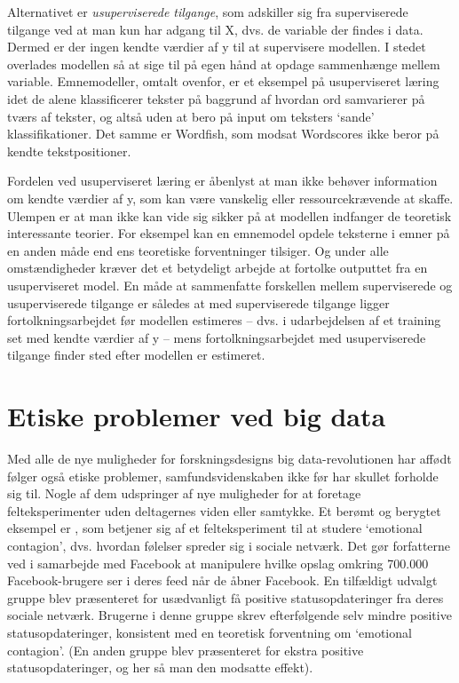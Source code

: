 \documentclass[12pt,]{article}
\begin{document}
Alternativet er \emph{usuperviserede tilgange}, som adskiller sig fra
superviserede tilgange ved at man kun har adgang til X, dvs. de variable
der findes i data. Dermed er der ingen kendte værdier af y til at
supervisere modellen. I stedet overlades modellen så at sige til på egen
hånd at opdage sammenhænge mellem variable. Emnemodeller, omtalt
ovenfor, er et eksempel på usuperviseret læring idet de alene
klassificerer tekster på baggrund af hvordan ord samvarierer på tværs af
tekster, og altså uden at bero på input om teksters `sande'
klassifikationer. Det samme er Wordfish, som modsat Wordscores ikke
beror på kendte tekstpositioner.

Fordelen ved usuperviseret læring er åbenlyst at man ikke behøver
information om kendte værdier af y, som kan være vanskelig eller
ressourcekrævende at skaffe. Ulempen er at man ikke kan vide sig sikker
på at modellen indfanger de teoretisk interessante teorier. For eksempel
kan en emnemodel opdele teksterne i emner på en anden måde end ens
teoretiske forventninger tilsiger. Og under alle omstændigheder kræver
det et betydeligt arbejde at fortolke outputtet fra en usuperviseret
model. En måde at sammenfatte forskellen mellem superviserede og
usuperviserede tilgange er således at med superviserede tilgange ligger
fortolkningsarbejdet før modellen estimeres -- dvs. i udarbejdelsen af
et training set med kendte værdier af y -- mens fortolkningsarbejdet med
usuperviserede tilgange finder sted efter modellen er estimeret.

\hypertarget{etiske-problemer-ved-big-data}{%
\section{Etiske problemer ved big
data}\label{etiske-problemer-ved-big-data}}

Med alle de nye muligheder for forskningsdesigns big data-revolutionen
har affødt følger også etiske problemer, samfundsvidenskaben ikke før
har skullet forholde sig til. Nogle af dem udspringer af nye muligheder
for at foretage felteksperimenter uden deltagernes viden eller samtykke.
Et berømt og berygtet eksempel er \citet{kramer2014experimental}, som
betjener sig af et felteksperiment til at studere `emotional contagion',
dvs. hvordan følelser spreder sig i sociale netværk. Det gør forfatterne
ved i samarbejde med Facebook at manipulere hvilke opslag omkring
700.000 Facebook-brugere ser i deres feed når de åbner Facebook. En
tilfældigt udvalgt gruppe blev præsenteret for usædvanligt få positive
statusopdateringer fra deres sociale netværk. Brugerne i denne gruppe
skrev efterfølgende selv mindre positive statusopdateringer, konsistent
med en teoretisk forventning om `emotional contagion'. (En anden gruppe
blev præsenteret for ekstra positive statusopdateringer, og her så man
den modsatte effekt).
\end{document}
